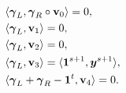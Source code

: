 \begin{flushleft}
\begin{minipage}{0.48\textwidth}
\begin{align}
        &
        \langle {\boldsymbol{\gamma}}_L, {\boldsymbol{\gamma}}_R  \circ \textbf{v}_0 \rangle = 0 \label{ceq0},\\
        &
        \langle {\boldsymbol{\gamma}}_L , \textbf{v}_{1} \rangle = 0 \label{ceq1},\\
        &
        \langle {\boldsymbol{\gamma}}_L, \textbf{v}_2 \rangle = 0 \label{ceq2},\\
        &
        \langle {\boldsymbol{\gamma}}_L, \textbf{v}_3 \rangle = \langle {\boldsymbol{1}}^{s+1}, {\boldsymbol{y}}^{s+1} \rangle \label{ceq3}, \\
        &
        \langle {\boldsymbol{\gamma}}_L + {\boldsymbol{\gamma}}_R - {\boldsymbol{1}}^{t}, \textbf{v}_{4} \rangle = 0 \label{ceq4}.
    \end{align}
    \label{fig:syseqn}
  \end{minipage}  
\end{flushleft}





